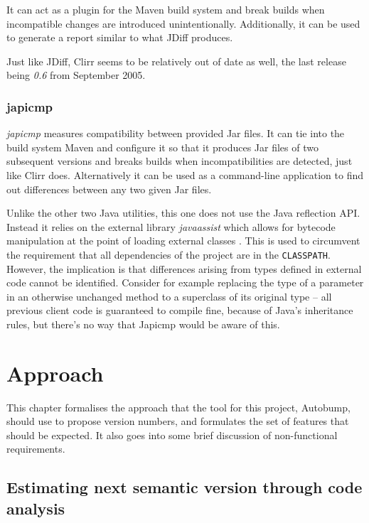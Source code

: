 \documentclass{l4proj}
\newcommand\genericstyle{\lstset{basicstyle=\ttm}}
\newcommand\codeinline[1]{{\genericstyle\lstinline!#1!}}
\begin{document}
It can act as a plugin for the Maven build system and break builds
when incompatible changes are introduced unintentionally.
Additionally, it can be used to generate a report similar to what
JDiff produces.

Just like JDiff, Clirr seems to be relatively out of date as well, the
last release being  \textit{0.6} from September 2005.

\subsection{japicmp}

\textit{japicmp} \cite{Japicmp} measures compatibility between
provided Jar files. It can tie into the build system Maven and
configure it so that it produces Jar files of two subsequent versions
and breaks builds when incompatibilities are detected, just like Clirr
does. Alternatively it can be used as a command-line application to
find out differences between any two given Jar files.

Unlike the other two Java utilities, this one does not use the Java
reflection API. Instead it relies on the external library
\textit{javaassist} \cite{JavaAssist} which allows for bytecode
manipulation at the point of loading external classes
\cite{BytecodeManip}. This is used to circumvent the requirement that
all dependencies of the project are in the \codeinline{CLASSPATH}.
However, the implication is that differences arising from types
defined in external code cannot be identified. Consider for example
replacing the type of a parameter in an otherwise unchanged method to
a superclass of its original type -- all previous client code is
guaranteed to compile fine, because of Java's inheritance rules, but
there's no way that Japicmp would be aware of this.

\chapter{Approach}
\label{Approach}

This chapter formalises the approach that the tool for this project,
Autobump, should use to propose version numbers, and formulates the
set of features that should be expected. It also goes into some brief
discussion of non-functional requirements.

\section{Estimating next semantic version through code analysis}
\label{EstimatingNextSemver}
\end{document}

